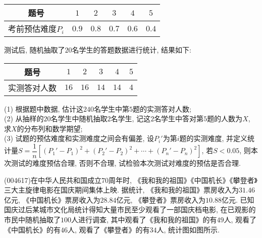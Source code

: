 \begin{center}
    \begin{tabular}{|c|c|c|c|c|c|}
        \hline
        题号 & $1$ & $2$ & $3$ & $4$ & $5$ \\ \hline
        考前预估难度$P_i$ & $0.9$ & $0.8$ & $0.7$ & $0.6$ & $0.4$ \\ \hline       
    \end{tabular}
\end{center}
测试后, 随机抽取了$20$名学生的答题数据进行统计, 结果如下:
\begin{center}
    \begin{tabular}{|c|c|c|c|c|c|}
        \hline
        题号 & $1$ & $2$ & $3$ & $4$ & $5$ \\ \hline
        实测答对人数 & $16$ & $16$ & $14$ & $14$ & $4$ \\ \hline       
    \end{tabular}
\end{center}
(1) 根据题中数据, 估计这$240$名学生中第$5$题的实测答对人数;\\
(2) 从抽样的$20$名学生中随机抽取$2$名学生, 记这$2$名学生中答对第$5$题的人数为$X$, 求$X$的分布列和数学期望;\\
(3) 试题的预估难度和实测难度之间会有偏差, 设$P_i'$为第$i$题的实测难度, 并定义统计量$S=\dfrac 1n[(P_1'-P_1)^2+(P_2'-P_2)^2+\cdots+(P_n'-P_n)^2]$, 若$S<0.05$, 则本次测试的难度预估合理, 否则不合理, 试检验本次测试对难度的预估是否合理.
\item (004617)在中华人民共和国成立$70$周年时, 《我和我的祖国》《中国机长》《攀登者》三大主旋律电影在国庆期间集体上映. 据统计, 《我和我的祖国》票房收入为$31.46$亿元, 《中国机长》票房收入为$28.84$亿元, 《攀登者》票房收入为$10.88$亿元. 已知国庆过后某城市文化局统计得知大量市民至少观看了一部国庆档电影, 在已观影的市民中随机抽取了$100$人进行调查, 其中观看了《我和我的祖国》的有$49$人, 观看了《中国机长》的有$46$人, 观看了《攀登者》的有$34$人, 统计图如图所示.
\begin{center}
\end{center}
